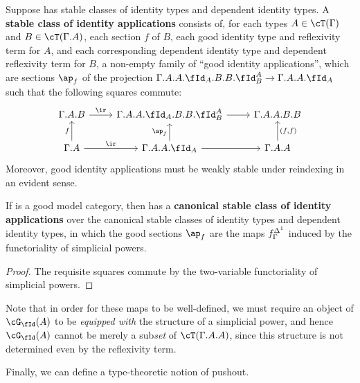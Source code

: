 \documentclass{amsart}
\let\C\cC
\let\T\cT
\let\r\ir
\let\Id\fId
\let\G\cG
\begin{document}
\begin{defn}\label{defn:ap}
  Suppose \C has stable classes of identity types and dependent identity types.
  A \textbf{stable class of identity applications} consists of, for each types $A\in\T(\Gamma)$ and $B\in\T(\Gamma.A)$, each section $f$ of $B$, each good identity type and reflexivity term for $A$, and each corresponding dependent identity type and dependent reflexivity term for $B$, a non-empty family of ``good identity applications'', which are sections $\ap_f$ of the projection $\Gamma.A.A.\Id_A.B.B.\Id^A_B \to \Gamma.A.A.\Id_A$ such that the following squares commute:
  \[
  \begin{tikzcd}
    \Gamma.A.B \ar[r,"\r"] & \Gamma.A.A.\Id_A.B.B.\Id^A_B \ar[r] & \Gamma.A.A.B.B \\
    \Gamma.A \ar[r,"\r"] \ar[u,"f"] & \Gamma.A.A.\Id_A \ar[u,"{\ap_f}"] \ar[r] & \Gamma.A.A \ar[u,"{(f,f)}",swap]
  \end{tikzcd}
  \]
  Moreover, good identity applications must be weakly stable under reindexing in an evident sense.
\end{defn}

\begin{thm}\label{thm:stable-ap}
  If \sM is a good model category, then \fibm has a \textbf{canonical stable class of identity applications} over the canonical stable classes of identity types and dependent identity types, in which the good sections $\ap_f$ are the maps $f^{\Delta^1}_\Gamma$ induced by the functoriality of simplicial powers.
\end{thm}
\begin{proof}
  The requisite squares commute by the two-variable functoriality of simplicial powers.
\end{proof}

Note that in order for these maps to be well-defined, we must require an object of $\G_\Id(A)$ to be \emph{equipped with} the structure of a simplicial power, and hence $\G_\Id(A)$ cannot be merely a sub\emph{set} of $\T(\Gamma.A.A)$, since this structure is not determined even by the reflexivity term.

Finally, we can define a type-theoretic notion of pushout.
\end{document}
